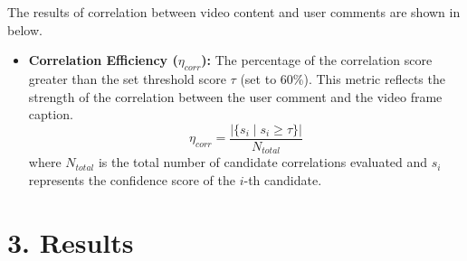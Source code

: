 \documentclass[12pt]{article}
\begin{document}
The results of correlation between video content and user comments are shown in below. 

\begin{itemize}

    \textbf{Correlation Score ($S_{corr}$):} The average correlation between user comments and captions across user comments and video captions. It is calculated as:
    \begin{equation}
        S_{corr} = \frac{1}{N_c} \sum_{i=1}^{N_c} s(c_i, v)
    \end{equation}
    where $N_c$ is the total number of comments and $s(c_i, v)$ denotes the relevance score of the $i$-th comment $c_i$ to video $v$.

    \item \textbf{Correlation Efficiency ($\eta_{corr}$):} The percentage of the correlation score greater than the set threshold score $\tau$ (set to 60\%). This metric reflects the strength of the correlation between the user comment and the video frame caption.
    \begin{equation}
        \eta_{corr} = \frac{|\{s_i \mid s_i \ge \tau\}|}{N_{total}}
    \end{equation}
    where $N_{total}$ is the total number of candidate correlations evaluated and $s_i$ represents the confidence score of the $i$-th candidate.

    
\end{itemize}



\section*{3. Results}
\end{document}
